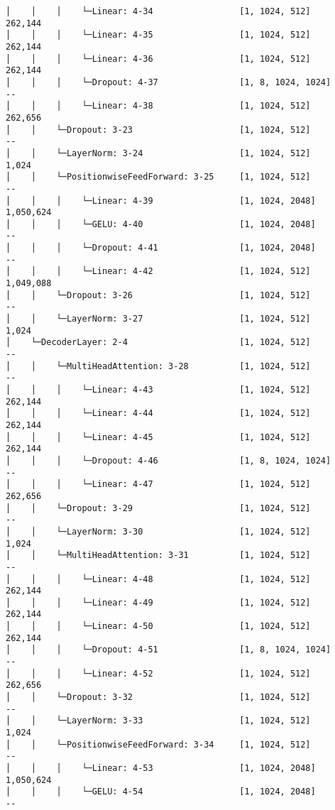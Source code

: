 \documentclass[12pt]{article}
\begin{document}
\begin{Verbatim}[commandchars=\\\{\}]
│    │    │    └─Linear: 4-34                 [1, 1024, 512]            262,144
│    │    │    └─Linear: 4-35                 [1, 1024, 512]            262,144
│    │    │    └─Linear: 4-36                 [1, 1024, 512]            262,144
│    │    │    └─Dropout: 4-37                [1, 8, 1024, 1024]        --
│    │    │    └─Linear: 4-38                 [1, 1024, 512]            262,656
│    │    └─Dropout: 3-23                     [1, 1024, 512]            --
│    │    └─LayerNorm: 3-24                   [1, 1024, 512]            1,024
│    │    └─PositionwiseFeedForward: 3-25     [1, 1024, 512]            --
│    │    │    └─Linear: 4-39                 [1, 1024, 2048]
1,050,624
│    │    │    └─GELU: 4-40                   [1, 1024, 2048]           --
│    │    │    └─Dropout: 4-41                [1, 1024, 2048]           --
│    │    │    └─Linear: 4-42                 [1, 1024, 512]
1,049,088
│    │    └─Dropout: 3-26                     [1, 1024, 512]            --
│    │    └─LayerNorm: 3-27                   [1, 1024, 512]            1,024
│    └─DecoderLayer: 2-4                      [1, 1024, 512]            --
│    │    └─MultiHeadAttention: 3-28          [1, 1024, 512]            --
│    │    │    └─Linear: 4-43                 [1, 1024, 512]            262,144
│    │    │    └─Linear: 4-44                 [1, 1024, 512]            262,144
│    │    │    └─Linear: 4-45                 [1, 1024, 512]            262,144
│    │    │    └─Dropout: 4-46                [1, 8, 1024, 1024]        --
│    │    │    └─Linear: 4-47                 [1, 1024, 512]            262,656
│    │    └─Dropout: 3-29                     [1, 1024, 512]            --
│    │    └─LayerNorm: 3-30                   [1, 1024, 512]            1,024
│    │    └─MultiHeadAttention: 3-31          [1, 1024, 512]            --
│    │    │    └─Linear: 4-48                 [1, 1024, 512]            262,144
│    │    │    └─Linear: 4-49                 [1, 1024, 512]            262,144
│    │    │    └─Linear: 4-50                 [1, 1024, 512]            262,144
│    │    │    └─Dropout: 4-51                [1, 8, 1024, 1024]        --
│    │    │    └─Linear: 4-52                 [1, 1024, 512]            262,656
│    │    └─Dropout: 3-32                     [1, 1024, 512]            --
│    │    └─LayerNorm: 3-33                   [1, 1024, 512]            1,024
│    │    └─PositionwiseFeedForward: 3-34     [1, 1024, 512]            --
│    │    │    └─Linear: 4-53                 [1, 1024, 2048]
1,050,624
│    │    │    └─GELU: 4-54                   [1, 1024, 2048]           --

\end{Verbatim}
\end{document}
